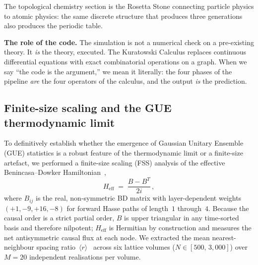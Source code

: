 \documentclass[aps,prd,twocolumn,superscriptaddress,nofootinbib,amsmath,amssymb,longbibliography]{revtex4-2}
\begin{document}
The topological chemistry section is the Rosetta Stone connecting
particle physics to atomic physics: the same discrete structure that
produces three generations also produces the periodic table.

\textbf{The role of the code.}
The simulation is not a numerical check on a pre-existing theory.
It \emph{is} the theory, executed.
The Kuratowski Calculus replaces continuous differential equations with
exact combinatorial operations on a graph.
When we say ``the code is the argument,'' we mean it literally:
the four phases of the pipeline \emph{are} the four operators of the
calculus, and the output \emph{is} the prediction.

\subsection{Finite-size scaling and the GUE thermodynamic limit}
\label{sec:rmt-discussion}

To definitively establish whether the emergence of Gaussian Unitary
Ensemble (GUE) statistics is a robust feature of the thermodynamic
limit or a finite-size artefact, we performed a finite-size scaling
(FSS) analysis of the effective Benincasa--Dowker
Hamiltonian~\cite{benincasa2010},
\begin{equation}\label{eq:bd-heff}
  H_{\mathrm{eff}} \;=\; \frac{B - B^{T}}{2i}\,,
\end{equation}
where $B_{ij}$ is the real, non-symmetric BD matrix with
layer-dependent weights $(+1, -9, +16, -8)$ for forward Hasse paths
of length~$1$ through~$4$.  Because the causal order is a strict
partial order, $B$ is upper triangular in any time-sorted basis and
therefore nilpotent; $H_{\mathrm{eff}}$ is Hermitian by construction
and measures the net antisymmetric causal flux at each node.
We extracted the mean nearest-neighbour spacing
ratio~$\langle r \rangle$~\cite{atas2013} across six lattice volumes
($N \in [500,\, 3{,}000]$) over $M = 20$ independent realisations per
volume.
\end{document}
